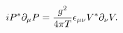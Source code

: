 \begin{equation}
iP^*\partial_\mu P ={g^2\over 4\pi
T}\epsilon_{\mu\nu}V^*\partial_\nu V.
\end{equation}

